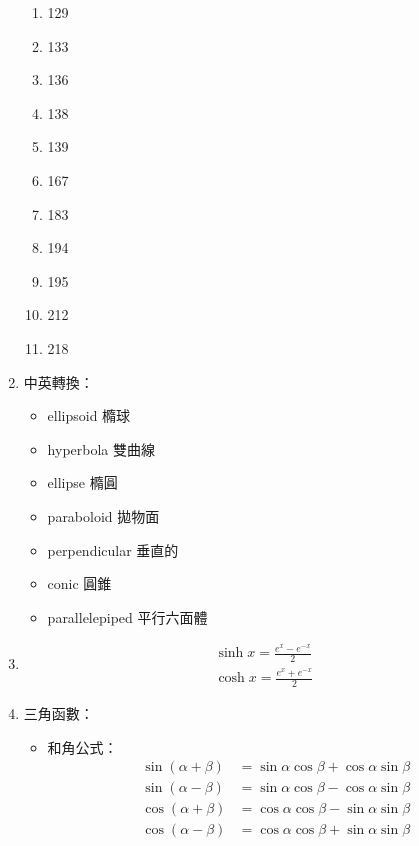 \begin{enumerate}
\begin{enumerate}
        \item 129
        \item 133
        \item 136
        \item 138
        \item 139
        \item 167
        \item 183
        \item 194
        \item 195
        \item 212
        \item 218
    \end{enumerate}
    \item 中英轉換：
    \begin{itemize}
        \item ellipsoid 橢球
        \item hyperbola 雙曲線
        \item ellipse 橢圓
        \item paraboloid 拋物面
        \item perpendicular 垂直的
        \item conic 圓錐
        \item parallelepiped 平行六面體
    \end{itemize}
    \item \begin{equation}
        \begin{aligned}
            \sinh x = \frac{e^x - e^{-x}}{2} \\
            \cosh x = \frac{e^x + e^{-x}}{2}
        \end{aligned}
    \end{equation}
    \item 三角函數：
    \begin{itemize}
        \item 和角公式： \begin{subequations}
                \begin{align}
                    \sin(\alpha + \beta) & = \sin\alpha\cos\beta + \cos\alpha\sin\beta \\
                    \sin(\alpha - \beta) & = \sin\alpha\cos\beta - \cos\alpha\sin\beta \\
                    \cos(\alpha + \beta) & = \cos\alpha\cos\beta - \sin\alpha\sin\beta \\
                    \cos(\alpha - \beta) & = \cos\alpha\cos\beta + \sin\alpha\sin\beta
                \end{align}

\end{subequations}
\end{itemize}
\end{enumerate}
